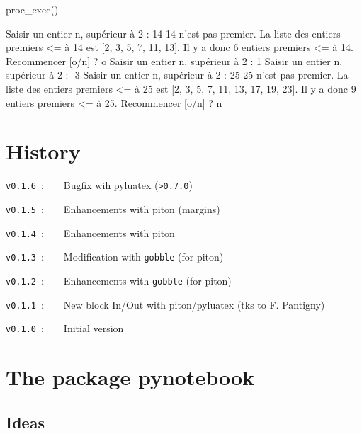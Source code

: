 \documentclass[english,11pt,a4paper]{article}
\begin{document}
\begin{NotebookIn}{\linewidth}
proc_exec()
\end{NotebookIn}

\begin{NotebookConsole}{\linewidth}
Saisir un entier n, supérieur à 2 : 14
14 n'est pas premier.
La liste des entiers premiers <= à 14 est [2, 3, 5, 7, 11, 13].
Il y a donc 6 entiers premiers <= à 14.
Recommencer [o/n] ? o
Saisir un entier n, supérieur à 2 : 1
Saisir un entier n, supérieur à 2 : -3
Saisir un entier n, supérieur à 2 : 25
25 n'est pas premier.
La liste des entiers premiers <= à 25 est [2, 3, 5, 7, 11, 13, 17, 19, 23].
Il y a donc 9 entiers premiers <= à 25.
Recommencer [o/n] ? n
\end{NotebookConsole}
%
%

\pagebreak

\section{History}

\verb|v0.1.6|~:~~~~Bugfix wih pyluatex (\texttt{>0.7.0})

\verb|v0.1.5|~:~~~~Enhancements with \textsf{piton} (margins)

\verb|v0.1.4|~:~~~~Enhancements with \textsf{piton}

\verb|v0.1.3|~:~~~~Modification with \texttt{gobble} (for \textsf{piton})

\verb|v0.1.2|~:~~~~Enhancements with \texttt{gobble} (for \textsf{piton})

\verb|v0.1.1|~:~~~~New block \textsf{In/Out} with \textsf{piton/pyluatex} (tks to F. Pantigny)

\verb|v0.1.0|~:~~~~Initial version

\vspace*{15mm}

\pagebreak

\section{The package pynotebook}

\subsection{Ideas}
\end{document}
